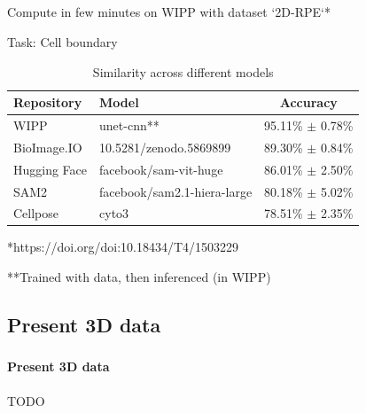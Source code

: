 \subsection{\slidetitle}
\begin{frame}
  \frametitle{\sectiontitle}
  \framesubtitle{\slidetitle}

  Compute in few minutes on WIPP with dataset `2D-RPE`*

  Task: Cell boundary

  \begin{center}
    \begin{table}
      \begin{tabular}{|l|l|c|}
       \hline
       \rowcolor{tableFirstRowColor}  Repository    & Model                       & Accuracy \\ [0.5ex]
       \hline
       \cellcolor{tableFirstColColor} WIPP          & unet-cnn**                  & 95.11\% $\pm$ 0.78\% \\
       \hline
       \cellcolor{tableFirstColColor} BioImage.IO   & 10.5281/zenodo.5869899      & 89.30\% $\pm$ 0.84\% \\
       \hline
       \cellcolor{tableFirstColColor} Hugging Face  & facebook/sam-vit-huge       & 86.01\% $\pm$ 2.50\% \\
       \hline
       \cellcolor{tableFirstColColor} SAM2          & facebook/sam2.1-hiera-large & 80.18\% $\pm$ 5.02\% \\
       \hline
       \cellcolor{tableFirstColColor} Cellpose      & cyto3                       & 78.51\% $\pm$ 2.35\% \\
       \hline
      \end{tabular}
      \caption{Similarity across different models}
    \end{table}
  \end{center}

  *https://doi.org/doi:10.18434/T4/1503229

  **Trained with data, then inferenced (in WIPP)

\end{frame}

\def\slidetitle{Present 3D data}

\subsection{\slidetitle}
\begin{frame}
  \frametitle{\sectiontitle}
  \framesubtitle{\slidetitle}

  TODO

\end{frame}

